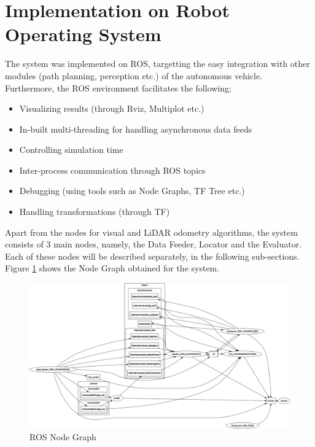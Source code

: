 \section{Implementation on Robot Operating System}
The system was implemented on \gls{ROS}, targetting the easy integration with other modules (path planning, perception etc.) of the autonomous vehicle. Furthermore, the \gls{ROS} environment facilitates the following;
\begin{itemize}
	\item Visualizing results (through Rviz, Multiplot etc.)
	\item In-built multi-threading for handling asynchronous data feeds
	\item Controlling simulation time
	\item Inter-process communication through \gls{ROS} topics
	\item Debugging (using tools such as Node Graphs, TF Tree etc.)
	\item Handling transformations (through TF)
\end{itemize}
Apart from the nodes for visual and \gls{LiDAR} odometry algorithms, the system consists of 3 main nodes, namely, the Data Feeder, Locator and the Evaluator. Each of these nodes will be described separately, in the following sub-sections. Figure \ref{fig:pa:nodeGraph} shows the Node Graph obtained for the system.

\begin{figure}[htp]
	\begin{center}
	\includegraphics[width=1.5\textwidth, angle=90]{figs/rosgraph.png}
	\end{center}
	\vspace{-0.5cm}
	\caption[ROS Node Graph]{ROS Node Graph}
	\label{fig:pa:nodeGraph}
	\vspace{0.5cm}
\end{figure}

